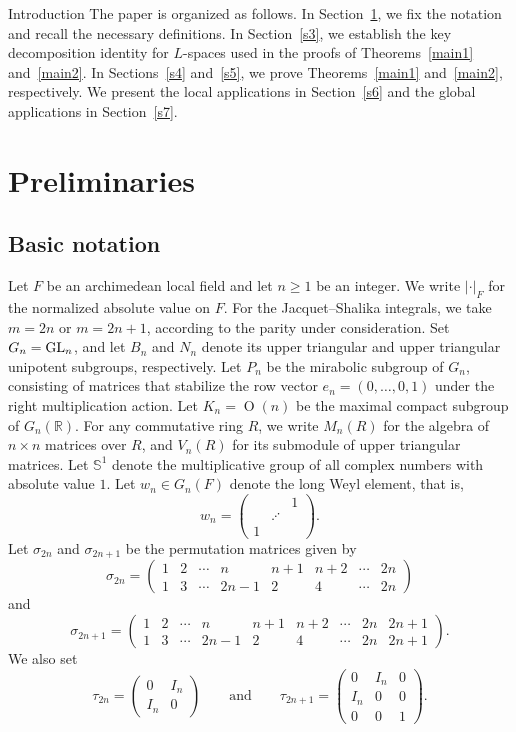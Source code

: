 \documentclass[12pt,reqno]{amsart}
\numberwithin{equation}{section}%
\numberwithin{equation}{subsection}
\theoremstyle{definition}
\theoremstyle{remark}
\begin{document}
\begin{section}{Introduction}
The paper is organized as follows. In Section~\ref{s2}, we fix the
notation and recall the necessary definitions. In Section~\ref{s3}, we
establish the key decomposition identity for $L$-spaces used in the
proofs of Theorems~\ref{main1} and~\ref{main2}. In
Sections~\ref{s4} and~\ref{s5}, we prove Theorems~\ref{main1}
and~\ref{main2}, respectively. We present the local applications in
Section~\ref{s6} and the global applications in Section~\ref{s7}.
\end{section} 

\section{Preliminaries}\label{s2}

\subsection{Basic notation}

Let \(F\) be an archimedean local field and let \(n\geq1\) be an
integer. We write \(|\cdot|_F\) for the normalized absolute value on
\(F\). For the Jacquet--Shalika integrals, we take \(m=2n\) or \(m=2n+1\), according to the parity under consideration. Set \(G_n={\rm GL}_n\), and let \(B_n\) and \(N_n\) denote its upper
triangular and upper triangular unipotent subgroups, respectively. Let \( P_n \) be the mirabolic subgroup of \( G_n \), consisting of matrices that stabilize the row vector \( e_n = (0, \dots, 0, 1) \) under the right multiplication action. Let $K_n=\operatorname{O}(n)$ be the maximal compact subgroup of $G_n(\mathbb{R})$. For any commutative ring $R$, we write $M_n(R)$ for the algebra of $n \times n$ matrices over $R$, and $V_n(R)$ for its submodule of upper triangular matrices. Let $\mathbb{S}^1$ denote the multiplicative group of all complex numbers with absolute value $1$. Let $w_n\in G_n(F)$ denote the long Weyl element, that is,
\[
w_n=
\begin{pmatrix}
&&1\\
&\iddots&\\
1&&
\end{pmatrix}.
\]
Let \(\sigma_{2n}\) and \(\sigma_{2n+1}\) be the permutation matrices
given by
\[
\sigma_{2n}
=
\left(
\begin{array}{cccc|cccc}
1 & 2 & \cdots & n
  & n+1 & n+2 & \cdots & 2n \\
1 & 3 & \cdots & 2n-1
  & 2 & 4 & \cdots & 2n
\end{array}
\right)
\]
and
\[
\sigma_{2n+1}
=
\left(
\begin{array}{cccc|ccccc}
1 & 2 & \cdots & n
  & n+1 & n+2 & \cdots & 2n & 2n+1 \\
1 & 3 & \cdots & 2n-1
  & 2 & 4 & \cdots & 2n & 2n+1
\end{array}
\right).
\]
We also set
\[
\tau_{2n}
=
\begin{pmatrix}
0&I_n\\
I_n&0
\end{pmatrix}
\qquad\text{and}\qquad
\tau_{2n+1}
=
\begin{pmatrix}
0&I_n&0\\
I_n&0&0\\
0&0&1
\end{pmatrix}.
\]
\end{document}
